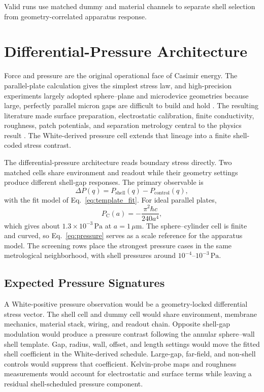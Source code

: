 \documentclass[11pt]{article}
\newcommand{\um}{\,\mu\mathrm{m}}
\begin{document}
Valid runs use matched dummy and material channels to separate shell selection
from geometry-correlated apparatus response.

\section{Differential-Pressure Architecture}

Force and pressure are the original operational face of Casimir energy. The
parallel-plate calculation gives the simplest stress law, and high-precision
experiments largely adopted sphere--plane and microdevice geometries because
large, perfectly parallel micron gaps are difficult to build and hold
\cite{Lamoreaux1997,MohideenRoy1998,Decca2011}. The resulting literature made
surface preparation, electrostatic calibration, finite conductivity,
roughness, patch potentials, and separation metrology central to the physics
result \cite{Bimonte2021,Behunin2011,Garrett2015}. The White-derived pressure
cell extends that lineage into a finite shell-coded stress contrast.

The differential-pressure architecture reads boundary stress directly. Two
matched cells share environment and readout while their geometry settings
produce different shell-gap responses. The primary observable is
\begin{equation}
  \Delta P(q) = P_{\mathrm{shell}}(q) - P_{\mathrm{control}}(q),
\end{equation}
with the fit model of Eq.~\ref{eq:template_fit}. For ideal parallel plates,
\begin{equation}
  P_{\mathrm{C}}(a) = -\frac{\pi^2\hbar c}{240a^4},
  \label{eq:pressure}
\end{equation}
which gives about \(1.3\times10^{-3}\,\mathrm{Pa}\) at \(a=1\um\). The
sphere--cylinder cell is finite and curved, so Eq.~\ref{eq:pressure} serves as a
scale reference for the apparatus model. The screening rows place the
strongest pressure cases in the same metrological neighborhood, with shell
pressures around \(10^{-4}\)--\(10^{-3}\,\mathrm{Pa}\).

\subsection{Expected Pressure Signatures}

A White-positive pressure observation would be a geometry-locked differential
stress vector. The shell cell and dummy cell would share environment, membrane
mechanics, material stack, wiring, and readout chain. Opposite shell-gap
modulation would produce a pressure contrast following the annular
sphere--wall shell template. Gap, radius, wall, offset, and length settings
would move the fitted shell coefficient in the White-derived schedule.
Large-gap, far-field, and non-shell controls would suppress that coefficient.
Kelvin-probe maps and roughness measurements would account for electrostatic
and surface terms while leaving a residual shell-scheduled pressure component.
\end{document}
